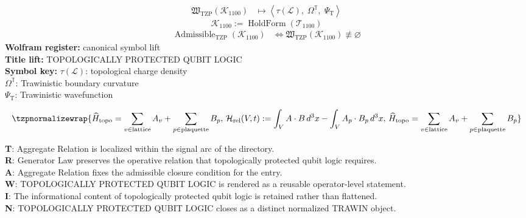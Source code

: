 \noindent
\begin{minipage}[t]{0.48\linewidth}
\begingroup
\small
\[
\begin{aligned}
\mathfrak{W}_{\mathrm{TZP}}\!\left(\mathcal{K}_{1100}\right)
&\longmapsto
\left\langle \tau(\mathcal{L}),\; \Omega^{\mathbb{T}},\; \Psi_{\mathrm{T}} \right\rangle
\end{aligned}
\]
\[
\mathcal{K}_{1100}
:=
\operatorname{HoldForm}\!\left(\mathcal{T}_{1100}\right)
\]
\[
\begin{aligned}
\operatorname{Admissible}_{\mathrm{TZP}}\!\left(\mathcal{K}_{1100}\right)
&\Longleftrightarrow
\mathfrak{W}_{\mathrm{TZP}}\!\left(\mathcal{K}_{1100}\right)\not\equiv\varnothing
\end{aligned}
\]
\textbf{Wolfram register:} canonical symbol lift\\
\textbf{Title lift:} TOPOLOGICALLY PROTECTED QUBIT LOGIC\\
\textbf{Symbol key:} \(\tau(\mathcal{L})\): topological charge density\\ \(\Omega^{\mathbb{T}}\): Trawinistic boundary curvature\\ \(\Psi_{\mathrm{T}}\): Trawinistic wavefunction
\par
\endgroup
\end{minipage}\hfill
\begin{minipage}[t]{0.48\linewidth}
\[
\tzpnormalizewrap{\widehat{H}_{\mathrm{topo}} = \sum_{v \in \mathrm{lattice}} A_v + \sum_{p \in \mathrm{plaquette}} B_p,\,\mathcal{H}_{\mathrm{rel}}(V,t) := \int_V A\cdot B\,d^{3}x - \int_V A_p\cdot B_p\,d^{3}x,\,\widehat{H}_{\mathrm{topo}} = \sum_{v \in \mathrm{lattice}} A_v + \sum_{p \in \mathrm{plaquette}} B_p}
\]

\small
\textbf{T}: Aggregate Relation is localized within the signal arc of the directory.\\
\textbf{R}: Generator Law preserves the operative relation that topologically protected qubit logic requires.\\
\textbf{A}: Aggregate Relation fixes the admissible closure condition for the entry.\\
\textbf{W}: TOPOLOGICALLY PROTECTED QUBIT LOGIC is rendered as a reusable operator-level statement.\\
\textbf{I}: The informational content of topologically protected qubit logic is retained rather than flattened.\\
\textbf{N}: TOPOLOGICALLY PROTECTED QUBIT LOGIC closes as a distinct normalized TRAWIN object.
\normalsize
\end{minipage}

